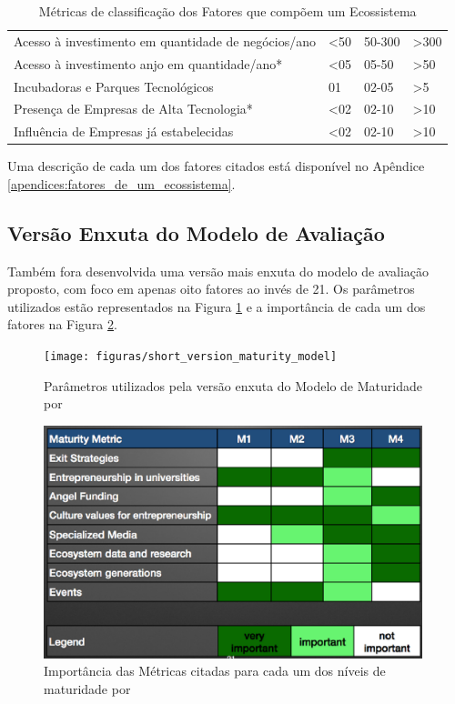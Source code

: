 \begin{table}[!htb]
\begin{tabular}{llll}
Acesso à investimento em quantidade de negócios/ano        &    <50     &   50-300   &    >300     \\
Acesso à investimento anjo em quantidade/ano*              &    <05     &   05-50    &    >50      \\
Incubadoras e Parques Tecnológicos                         &     01     &    02-05   &    >5       \\
Presença de Empresas de Alta Tecnologia*                   &    <02     &   02-10    &    >10      \\
Influência de Empresas já estabelecidas                    &    <02     &   02-10    &    >10      \\
\end{tabular}
\caption{Métricas de classificação dos Fatores que compõem um Ecossistema}
\label{table:metricas_de_classificacao_dos_fatores}
\end{table}

Uma descrição de cada um dos fatores citados está disponível no Apêndice \ref{apendices:fatores_de_um_ecossistema}.

\subsection{Versão Enxuta do Modelo de Avaliação}
\label{subsection:versao_enxuta_do_modelo_de_avaliacao}

Também fora desenvolvida uma versão mais enxuta do modelo de avaliação proposto, com foco em apenas oito fatores ao invés de 21. Os parâmetros utilizados estão representados na Figura \ref{figure:short_version_maturity_model} e a importância de cada um dos fatores na Figura \ref{figure:metrics_importance}.

\begin{figure}[!htb]
\centering
\texttt{[image: figuras/short\_version\_maturity\_model]}
\caption{Parâmetros utilizados pela versão enxuta do Modelo de Maturidade por }
\label{figure:short_version_maturity_model}
\end{figure}

\begin{figure}[!htb]
\centering
\includegraphics[width=11cm,angle=0]{figuras/metrics_importance}
\caption{Importância das Métricas citadas para cada um dos níveis de maturidade por }
\label{figure:metrics_importance}
\end{figure}

